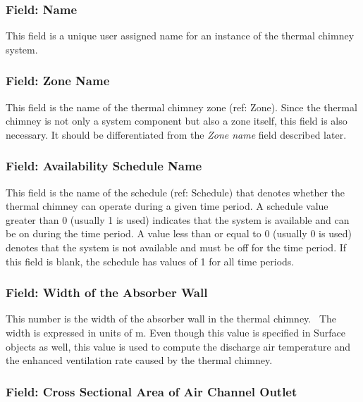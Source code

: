 \subsubsection{Field: Name}\label{field-name-9-002}

This field is a unique user assigned name for an instance of the thermal chimney system.

\subsubsection{Field: Zone Name}\label{field-zone-name-7}

This field is the name of the thermal chimney zone (ref: Zone). Since the thermal chimney is not only a system component but also a zone itself, this field is also necessary. It should be differentiated from the \emph{Zone name} field described later.

\subsubsection{Field: Availability Schedule Name}\label{field-availability-schedule-name-1-000}

This field is the name of the schedule (ref: Schedule) that denotes whether the thermal chimney can operate during a given time period. A schedule value greater than 0 (usually 1 is used) indicates that the system is available and can be on during the time period. A value less than or equal to 0 (usually 0 is used) denotes that the system is not available and must be off for the time period. If this field is blank, the schedule has values of 1 for all time periods.

\subsubsection{Field: Width of the Absorber Wall}\label{field-width-of-the-absorber-wall}

This number is the width of the absorber wall in the thermal chimney.~ The width is expressed in units of m. Even though this value is specified in Surface objects as well, this value is used to compute the discharge air temperature and the enhanced ventilation rate caused by the thermal chimney.

\subsubsection{Field: Cross Sectional Area of Air Channel Outlet}\label{field-cross-sectional-area-of-air-channel-outlet}

